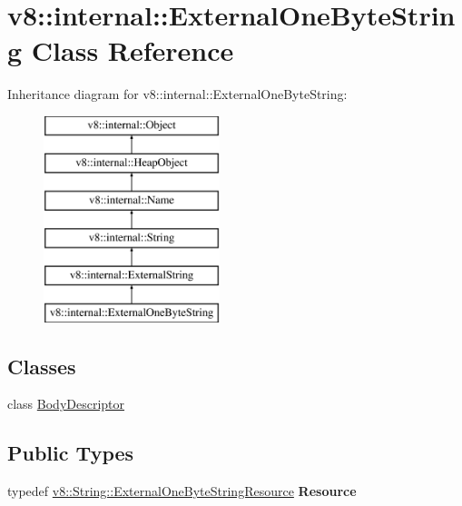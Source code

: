 \hypertarget{classv8_1_1internal_1_1_external_one_byte_string}{}\section{v8\+:\+:internal\+:\+:External\+One\+Byte\+String Class Reference}
\label{classv8_1_1internal_1_1_external_one_byte_string}
Inheritance diagram for v8\+:\+:internal\+:\+:External\+One\+Byte\+String\+:\begin{figure}[H]
\begin{center}
\leavevmode
\includegraphics[height=6.000000cm]{classv8_1_1internal_1_1_external_one_byte_string}
\end{center}
\end{figure}
\subsection*{Classes}
\begin{DoxyCompactItemize}
\item 
class \hyperlink{classv8_1_1internal_1_1_external_one_byte_string_1_1_body_descriptor}{Body\+Descriptor}
\end{DoxyCompactItemize}
\subsection*{Public Types}
\begin{DoxyCompactItemize}
\item 
typedef \hyperlink{classv8_1_1_string_1_1_external_one_byte_string_resource}{v8\+::\+String\+::\+External\+One\+Byte\+String\+Resource} {\bfseries Resource}\hypertarget{classv8_1_1internal_1_1_external_one_byte_string_a6a4abdba6f54562050b981e87c302005}{}\label{classv8_1_1internal_1_1_external_one_byte_string_a6a4abdba6f54562050b981e87c302005}

\end{DoxyCompactItemize}
